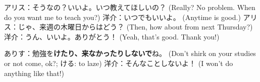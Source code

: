 \documentclass[../nihongo-gakushuu-kyouzai.tex]{subfiles}
\begin{document}
\begin{itemize}
    アリス：そうなの？いいよ。いつ教えてほしいの？ (Really? No problem. When do you want me to teach you?)
    洋介：いつでもいいよ。 (Anytime is good.)
    アリス：じゃ、来週の木曜日からはどう？ (Then, how about from next Thursday?)
    洋介：うん、いいよ。ありがとう！ (Yeah, that's good. Thank you!)

    ありす：勉強を\textbf{けたり、来なかったりしないで}ね。 (Don't shirk on your studies or not come, ok?; ける: to laze)
    洋介：そんなことしないよ！ (I won't do anything like that!)
\end{itemize}
\end{document}
